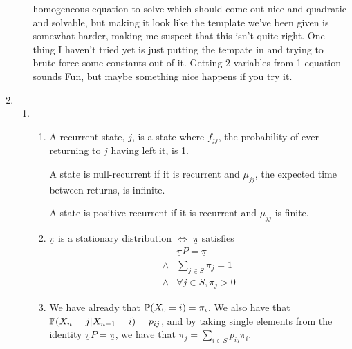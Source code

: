 \documentclass{article}
\begin{document}
\begin{enumerate}
\begin{enumerate}
homogeneous equation to solve which should come out nice and quadratic and
solvable, but making it look like the template we've been given is somewhat
harder, making me suspect that this isn't quite right. One thing I haven't tried
yet is just putting the tempate in and trying to brute force some constants out
of it. Getting 2 variables from 1 equation sounds Fun, but maybe something nice
happens if you try it.
\end{enumerate}
\item 
\begin{enumerate}
\item
\begin{enumerate}
\item
A recurrent state, $j$, is a state where $f_{jj}$, the probability of ever
returning to $j$ having left it, is 1.

A state is null-recurrent if it is recurrent and $\mu_{jj}$, the expected time
between returns, is infinite.

A state is positive recurrent if it is recurrent and $\mu_{jj}$ is finite.

\item
$\underline{\pi}$ is a stationary distribution $\iff$ $\underline{\pi}$
satisfies
\begin{align*}
&\underline{\pi}P = \underline{\pi}\\
\wedge &\sum_{j \in S} \pi_j = 1\\
\wedge & \forall j \in S, \pi_j > 0
\end{align*}
\item 
We have already that $\mathbb{P} (X_0 = i) = \pi_i$. We also have that $\mathbb{P} (X_n = j |
X_{n-1} = i) = p_{ij}$, and by taking single elements from the identity
$\underline{\pi}P = \underline{\pi}$, we have that $\pi_j = \sum\limits_{i\in
S}p_{ij}\pi_i$.


\end{enumerate}
\end{enumerate}
\end{enumerate}
\end{document}
